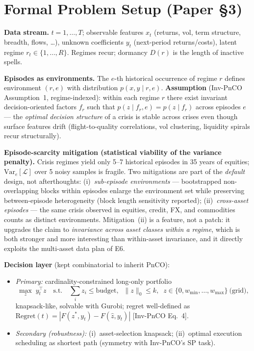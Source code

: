 \documentclass[11pt]{article}
\begin{document}
\section{Formal Problem Setup (Paper \S3)}
\textbf{Data stream.} $t=1,\dots,T$; observable features $x_t$ (returns, vol, term structure, breadth, flows, \dots), unknown coefficients $y_t$ (next-period returns/costs), latent regime $r_t\in\{1,\dots,R\}$. Regimes recur; dormancy $D(r)$ is the length of inactive spells.

\medskip\noindent\textbf{Episodes as environments.} The $e$-th historical occurrence of regime $r$ defines environment $(r,e)$ with distribution $p(x,y\mid r,e)$. \textbf{Assumption} (Inv-PnCO Assumption~1, regime-indexed): within each regime $r$ there exist invariant decision-oriented factors $f_r$ such that $p(z\mid f_r, e)=p(z\mid f_r)$ across episodes $e$ --- the \emph{optimal decision structure} of a crisis is stable across crises even though surface features drift (flight-to-quality correlations, vol clustering, liquidity spirals recur structurally).

\medskip\noindent\textbf{Episode-scarcity mitigation (statistical viability of the variance penalty).} Crisis regimes yield only 5--7 historical episodes in 35 years of equities; $\mathrm{Var}_e[\mathcal L]$ over 5 noisy samples is fragile. Two mitigations are part of the \emph{default} design, not afterthoughts: (i)~\emph{sub-episode environments} --- bootstrapped non-overlapping blocks within episodes enlarge the environment set while preserving between-episode heterogeneity (block length sensitivity reported); (ii)~\emph{cross-asset episodes} --- the same crisis observed in equities, credit, FX, and commodities counts as distinct environments. Mitigation~(ii) is a feature, not a patch: it upgrades the claim to \emph{invariance across asset classes within a regime}, which is both stronger and more interesting than within-asset invariance, and it directly exploits the multi-asset data plan of E6.

\medskip\noindent\textbf{Decision layer} (kept combinatorial to inherit PnCO):
\begin{itemize}
  \item \emph{Primary:} cardinality-constrained long-only portfolio
  \[
    \max_z \; y_t^\top z \quad \text{s.t.} \quad \textstyle\sum_i z_i \le \text{budget},\;\; \|z\|_0 \le k,\;\; z \in \{0, w_{\min},\dots,w_{\max}\}\ \text{(grid)},
  \]
  knapsack-like, solvable with Gurobi; regret well-defined as $\mathrm{Regret}(t)=|F(z^\ast,y_t)-F(\hat z, y_t)|$ [Inv-PnCO Eq.~4].
  \item \emph{Secondary (robustness):} (i)~asset-selection knapsack; (ii)~optimal execution scheduling as shortest path (symmetry with Inv-PnCO's SP task).
\end{itemize}
\end{document}

